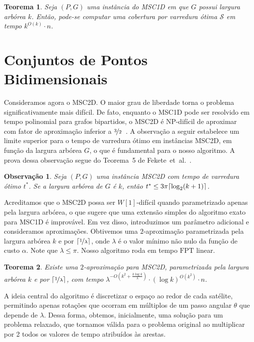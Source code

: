 \documentclass[12pt]{article}
\newtheorem{theorem}{Teorema}
\newtheorem{observation}{Observação}
\DeclarePairedDelimiter\ceil{\lceil}{\rceil}
\newcommand{\cals}{\mathcal{S}}
\begin{document}
\begin{theorem}
    \label{teo:msc1d}
    Seja $(P, G)$ uma instância do MSC1D em que $G$ possui largura arbórea $k$. Então, pode-se computar uma cobertura por varredura ótima $\cals$ em tempo $k^{O(k)} \cdot n$.
\end{theorem}

\section{Conjuntos de Pontos Bidimensionais}

Consideramos agora o MSC2D.
%
O maior grau de liberdade torna o problema significativamente mais difícil.
%
De fato, enquanto o MSC1D pode ser resolvido em tempo polinomial para grafos bipartidos, o MSC2D é NP-difícil de aproximar com fator de aproximação inferior a $\nicefrac{3}{2}$~\cite{Fe21}.
%
A observação a seguir estabelece um limite superior para o tempo de varredura ótimo em instâncias MSC2D, em função da largura arbórea $G$, o que é fundamental para o nosso algoritmo. A prova dessa observação segue do Teorema~5 de Fekete~et~al.~\cite{Fe21}. \medskip

\begin{observation}
    \label{obs:msc2d}
    Seja $(P, G)$ uma instância MSC2D com tempo de varredura ótimo $t^*$. Se a largura arbórea de $G$ é $k$, então $t^* \le 3\pi\ceil{\log_2(k+1)}$.
\end{observation}

Acreditamos que o MSC2D possa ser \mbox{$W[1]$-difícil} quando parametrizado apenas pela largura arbórea, o que sugere que uma extensão simples do algoritmo exato para MSC1D é improvável.
%
Em vez disso, introduzimos um parâmetro adicional e consideramos aproximações.
%
Obtivemos uma $2$-aproximação parametrizada pela largura arbórea $k$ e por $\ceil{\nicefrac{1}{\lambda}}$, onde $\lambda$ é o valor mínimo não nulo da função de custo $\alpha$. Note que $\lambda\le \pi$. Nosso algoritmo roda em tempo $\text{FPT}$ linear. \medskip

\begin{theorem}
    \label{teo:msc2d}
    Existe uma $2$-aproximação para MSC2D, parametrizada pela largura arbórea $k$ e por $\ceil{\nicefrac{1}{\lambda}}$, com tempo $\lambda^{-O(k^2+\frac{k\log k}{\lambda})}\cdot (\log k)^{O(k^2)}\cdot n$.
\end{theorem}

A ideia central do algoritmo é discretizar o espaço ao redor de cada satélite, permitindo apenas rotações que ocorram em múltiplos de um passo angular $\theta$ que depende de $\lambda$.
%
Dessa forma, obtemos, inicialmente, uma solução para um problema relaxado, que tornamos válida para o problema original ao multiplicar por 2 todos os valores de tempo atribuídos às arestas.
\end{document}
